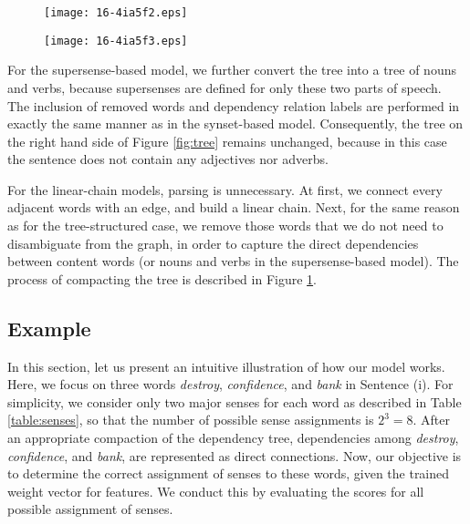 \documentclass[english]{jnlp_1.4}
\begin{document}
\begin{figure}[t]
\setlength{\captionwidth}{0.45\textwidth}
\begin{minipage}[b]{0.45\textwidth}
\begin{center}
\texttt{[image: 16-4ia5f2.eps]}
\end{center}
\label{fig:tree}
\end{minipage}
\hfill
\begin{minipage}[b]{0.45\textwidth}
\begin{center}
\texttt{[image: 16-4ia5f3.eps]}
\end{center}
\label{fig:linear-chain}
\end{minipage}
\end{figure}

For the supersense-based model, we further convert the tree into a tree of nouns and verbs, because supersenses are defined for only these two parts of speech.
The inclusion of removed words and dependency relation labels are performed in exactly the same manner as in the synset-based model.
Consequently, the tree on the right hand side of Figure \ref{fig:tree} remains unchanged, because in this case the sentence does not contain any adjectives nor adverbs.


For the linear-chain models, parsing is unnecessary.
At first, we connect every adjacent words with an edge, and build a linear chain.
Next, for the same reason as for the tree-structured case, we remove those words that we do not need to disambiguate from the graph, in order to capture the direct dependencies between content words (or nouns and verbs in the supersense-based model).
The process of compacting the tree is described in Figure \ref{fig:linear-chain}.


\subsection{Example}

In this section, let us present an intuitive illustration of how our model works.
Here, we focus on three words \textit{destroy}, \textit{confidence}, and \textit{bank} in Sentence (i).
For simplicity, we consider only two major senses for each word as described in Table \ref{table:senses}, so that the number of possible sense assignments is $2^3=8$.
After an appropriate compaction of the dependency tree, dependencies among \textit{destroy}, \textit{confidence}, and \textit{bank}, are represented as direct connections.
Now, our objective is to determine the correct assignment of senses to these words, given the trained weight vector for features.
We conduct this by evaluating the scores for all possible assignment of senses.
\end{document}
